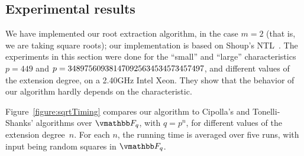 

\subsection{Experimental results}
We have implemented our root extraction algorithm, in the case $m=2$
(that is, we are taking square roots); our implementation is based on
Shoup's NTL~\cite{NTL2009}.  The experiments in this section were done
for the ``small'' and ``large'' characteristics $p = 449$ and $p =
\seqsplit{348975609381470925634534573457497}$, and different values of
the extension degree, on a 2.40GHz Intel Xeon. They show that the
behavior of our algorithm hardly depends on the characteristic.

Figure~\ref{figure:sqrtTiming} compares our algorithm to Cipolla's and
Tonelli-Shanks' algorithms over $\F_q$, with $q = p^n$, for different
values of the extension degree~$n$. For each $n$, the running time is
averaged over five runs, with input being random squares in $\F_q$.

